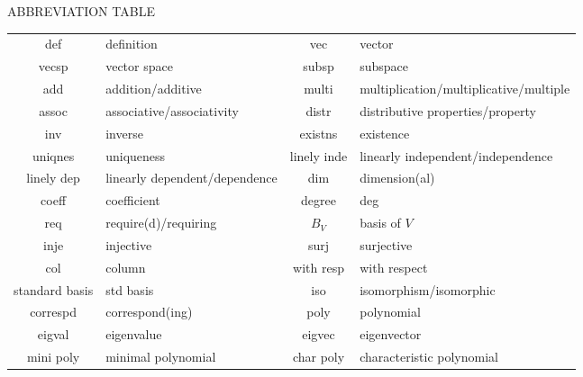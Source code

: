 {\begin{center}
\vspace{24pt}
{\Large A{\normalsize BBREVIATION} T{\normalsize ABLE}}\vspace{8pt}\par
\begin{tabularx}{0.95\textwidth}{
		| c |
		| >{\raggedright\arraybackslash}X | c |
		| >{\raggedright\arraybackslash}X| }
	\hline
def&			definition & vec&			vector\\
vecsp&			vector space & subsp&			subspace\\
add&			addition/additive & multi&			multiplication/multiplicative/multiple\\
assoc&			associative/associativity & distr&			distributive properties/property\\
inv&			inverse & existns&		existence\\
uniqnes&		uniqueness & linely inde&	linearly independent/independence\\
linely dep&		linearly dependent/dependence & dim&			dimension(al)\\
coeff& coefficient & degree& deg\\
req& require(d)/requiring & $B_V$ & basis of $V$\\
inje&			injective & surj&			surjective\\
col&			column & with resp&		with respect\\
standard basis& std basis & iso&			isomorphism/isomorphic\\
correspd&		correspond(ing) & poly&			polynomial\\
eigval&			eigenvalue & eigvec&			eigenvector\\
mini poly&		minimal polynomial & char poly&		characteristic polynomial\\\hline
\end{tabularx}
\end{center}

\clearpage
}{}

\begin{large}


%

\end{large}


